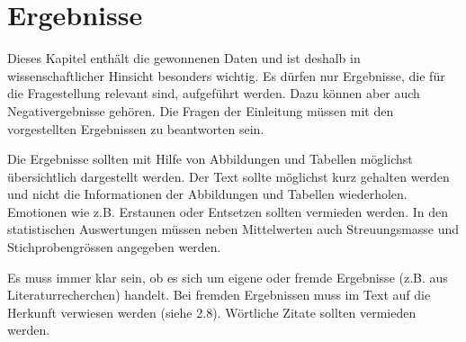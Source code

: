 \chapter{Ergebnisse}
\label{chap:results}

Dieses Kapitel enthält die gewonnenen Daten und ist deshalb in wissenschaftlicher Hinsicht besonders wichtig. Es dürfen nur Ergebnisse, die für die Fragestellung relevant sind, aufgeführt werden. Dazu können aber auch Negativergebnisse gehören. Die Fragen der Einleitung müssen mit den vorgestellten Ergebnissen zu beantworten sein.

Die Ergebnisse sollten mit Hilfe von Abbildungen und Tabellen möglichst übersichtlich dargestellt werden. Der Text sollte möglichst kurz gehalten werden und nicht die Informationen der Abbildungen und Tabellen wiederholen. Emotionen wie z.B. Erstaunen oder Entsetzen sollten vermieden werden. In den statistischen Auswertungen müssen neben Mittelwerten auch Streuungsmasse und Stichprobengrössen angegeben werden.

Es muss immer klar sein, ob es sich um eigene oder fremde Ergebnisse (z.B. aus Literaturrecherchen) handelt. Bei fremden Ergebnissen muss im Text auf die Herkunft verwiesen werden (siehe 2.8). Wörtliche Zitate sollten vermieden werden.

